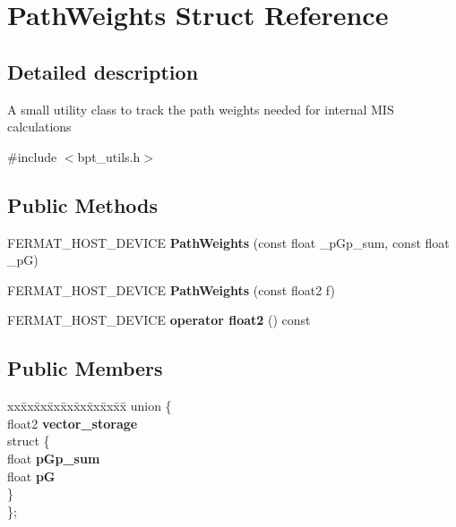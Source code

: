 \hypertarget{struct_path_weights}{}\section{Path\+Weights Struct Reference}
\label{struct_path_weights}


\subsection{Detailed description}
\begin{DoxyParagraph}{}
A small utility class to track the path weights needed for internal M\+IS calculations 
\end{DoxyParagraph}


{\ttfamily \#include $<$bpt\+\_\+utils.\+h$>$}

\subsection*{Public Methods}
\begin{DoxyCompactItemize}
\item 
\mbox{\label{struct_path_weights_afa7b3a03eee65d95a806103ea47a2a49}} 
F\+E\+R\+M\+A\+T\+\_\+\+H\+O\+S\+T\+\_\+\+D\+E\+V\+I\+CE {\bfseries Path\+Weights} (const float \+\_\+p\+Gp\+\_\+sum, const float \+\_\+pG)
\item 
\mbox{\label{struct_path_weights_abd4652b8d94942fbc004f5a31a225d06}} 
F\+E\+R\+M\+A\+T\+\_\+\+H\+O\+S\+T\+\_\+\+D\+E\+V\+I\+CE {\bfseries Path\+Weights} (const float2 f)
\item 
\mbox{\label{struct_path_weights_af404d428ac5c73593e27b829dd45340c}} 
F\+E\+R\+M\+A\+T\+\_\+\+H\+O\+S\+T\+\_\+\+D\+E\+V\+I\+CE {\bfseries operator float2} () const
\end{DoxyCompactItemize}
\subsection*{Public Members}
\begin{DoxyCompactItemize}
\item 
\mbox{\label{struct_path_weights_addb09feed323414704b72c88a12f1c1e}} 
\begin{tabbing}
xx\=xx\=xx\=xx\=xx\=xx\=xx\=xx\=xx\=\kill
union \{\\
\>float2 {\bfseries vector\_storage}\\
\mbox{\label{union_path_weights_1_1_0D0_a8ccf7df59fa8876e331d66fc2733b136}} 
\>struct \{\\
\>\>float {\bfseries pGp\_sum}\\
\>\>float {\bfseries pG}\\
\>\} \\
\}; \\

\end{tabbing}\end{DoxyCompactItemize}


